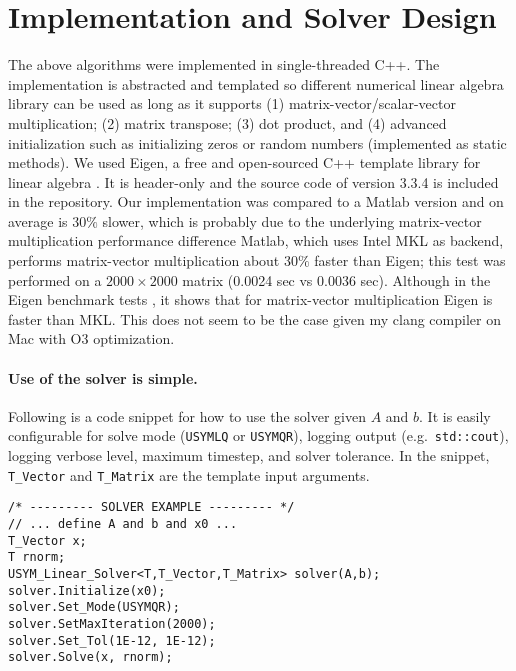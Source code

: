 \documentclass[10pt,letterpaper]{article}
\newcommand{\alg}[1]{\textproc{#1}}
\begin{document}
\section{Implementation and Solver Design} 
The above algorithms were implemented in single-threaded C++. The 
implementation is abstracted and templated so different numerical 
linear algebra library can be used as long as it supports 
(1) matrix-vector/scalar-vector multiplication; (2) matrix transpose; 
(3) dot product, and (4) advanced initialization such as initializing 
zeros or random numbers (implemented as static methods). We used Eigen,
a free and open-sourced C++ template library for linear algebra 
\cite{sw:Eigen}. It is header-only and the source code of version 3.3.4
is included in the repository. Our \alg{USYMLQ} implementation was compared 
to a Matlab version and on average is $30\%$ slower, which is probably 
due to the underlying matrix-vector multiplication performance difference 
Matlab, which uses Intel MKL as backend, performs matrix-vector 
multiplication about $30\%$ faster than Eigen; this test was performed 
on a $2000\times 2000$ matrix (0.0024 sec vs 0.0036 sec). 
Although in the Eigen benchmark tests \cite{sw:EigenBenchmark}, it shows 
that for matrix-vector multiplication Eigen is faster than MKL. 
This does not seem to be the case given my clang compiler on Mac with 
O3 optimization. \\

\paragraph{Use of the solver is simple.} Following is a code snippet for 
how to use the solver given $A$ and $b$. It is easily configurable for 
solve mode (\texttt{USYMLQ} or \texttt{USYMQR}), logging output 
(e.g.~\texttt{std::cout}), logging verbose level, maximum timestep, and 
solver tolerance. In the snippet, \texttt{T\_Vector} and \texttt{T\_Matrix} 
are the template input arguments. 
\begin{lstlisting}
/* --------- SOLVER EXAMPLE --------- */         
// ... define A and b and x0 ... 
T_Vector x; 
T rnorm; 
USYM_Linear_Solver<T,T_Vector,T_Matrix> solver(A,b); 
solver.Initialize(x0); 
solver.Set_Mode(USYMQR);
solver.SetMaxIteration(2000);
solver.Set_Tol(1E-12, 1E-12);
solver.Solve(x, rnorm); 
\end{lstlisting}
\end{document}
